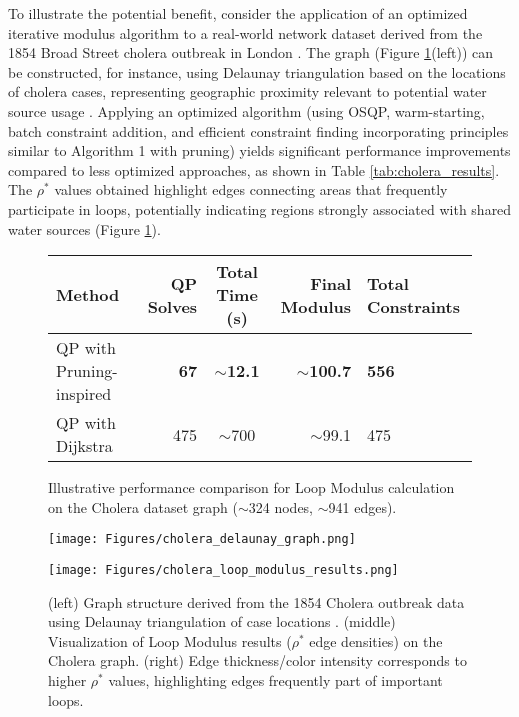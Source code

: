 \documentclass{article}
\begin{document}
To illustrate the potential benefit, consider the application of an optimized iterative modulus algorithm to a real-world network dataset derived from the 1854 Broad Street cholera outbreak in London \cite{snow1856mode}. The graph (Figure \ref{fig:cholera_results_viz}(left)) can be constructed, for instance, using Delaunay triangulation based on the locations of cholera cases, representing geographic proximity relevant to potential water source usage \cite{networkx_delaunay}.
Applying an optimized algorithm (using OSQP, warm-starting, batch constraint addition, and efficient constraint finding incorporating principles similar to Algorithm 1 with pruning) yields significant performance improvements compared to less optimized approaches, as shown in Table \ref{tab:cholera_results}. The $\rho^*$ values obtained highlight edges connecting areas that frequently participate in loops, potentially indicating regions strongly associated with shared water sources (Figure \ref{fig:cholera_results_viz}).

\begin{figure}[ht]
 \centering
 \begin{tabular}{|l | r | c | r | l |}
 \hline
 \textbf{Method} & \textbf{QP Solves} & \textbf{Total Time (s)} & \textbf{Final Modulus} & \textbf{Total Constraints}  \\ \hline 
 QP with Pruning-inspired & \textbf{67} & \textbf{$\sim$12.1} & \textbf{$\sim$100.7} & \textbf{556} \\ \hline
 QP with Dijkstra & 475 & $\sim$700 & $\sim$99.1 & 475 \\ \hline
 \end{tabular}
 \caption{Illustrative performance comparison for Loop Modulus calculation on the Cholera dataset graph ($\sim$324 nodes, $\sim$941 edges).}
 \label{tab:cholera_results}
 \vspace{1em} %
 \centering
    \begin{minipage}[c]{0.25\textwidth}
        \centering
        \texttt{[image: Figures/cholera\_delaunay\_graph.png]}
    \end{minipage}%
    \hfill
    \begin{minipage}[c]{0.75\textwidth}
        \centering
        \texttt{[image: Figures/cholera\_loop\_modulus\_results.png]}
    \end{minipage}
 \caption{(left) Graph structure derived from the 1854 Cholera outbreak data using Delaunay triangulation of case locations \cite{networkx_delaunay}. (middle) Visualization of Loop Modulus results ($\rho^*$ edge densities) on the Cholera graph. (right) Edge thickness/color intensity corresponds to higher $\rho^*$ values, highlighting edges frequently part of important loops.}
 \label{fig:cholera_results_viz}
\end{figure}
\end{document}

